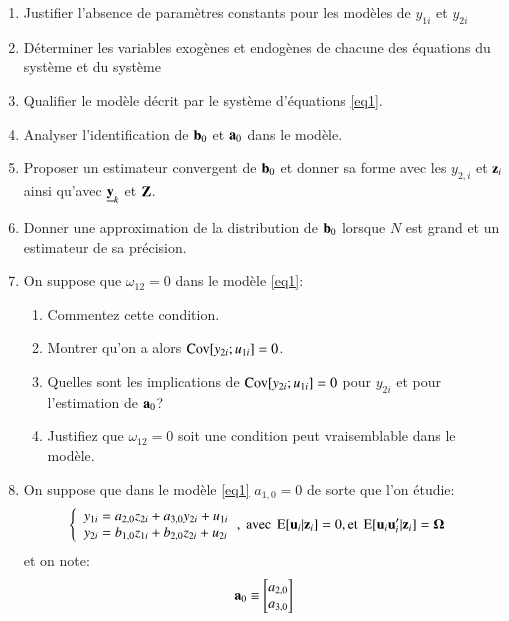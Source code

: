 \documentclass[10pt, reqno]{amsart}
\begin{document}
\begin{enumerate}
    \item Justifier l’absence de paramètres constants pour les modèles de $y_{1i}$ et $y_{2i}$ 
    \item  Déterminer les variables exogènes et endogènes de chacune des équations
    du système et du système
    \item Qualifier le modèle décrit par le système d’équations \eqref{eq1}.
    \item Analyser l’identification de ${\mathbf b}_0$ et ${\mathbf a}_0$ dans le modèle.  
    \item Proposer un estimateur convergent de ${\mathbf b}_0$ et donner sa forme avec les $y_{2,i}$ et ${\mathbf z}_i$ 
    ainsi qu’avec $\underline{{\mathbf y}}_k$ et $\mathbf Z$.
    \item Donner une approximation de la distribution de ${\mathbf b}_0$ lorsque $N$ est grand et un estimateur de sa précision.
    \item On suppose que $\omega_{12} = 0$ dans le modèle \eqref{eq1}:
    \begin{enumerate}
        \item Commentez cette condition. 
        \item Montrer qu’on a alors $\operatorname{Cov}[y_{2i}; u_{1i}]= 0$.
        \item Quelles sont les implications de $\operatorname{Cov}[y_{2i}; u_{1i}]= 0$ pour $y_{2i}$ et pour l’estimation de ${\mathbf a}_0$?
        \item Justifiez que $\omega_{12} = 0$ soit une condition peut vraisemblable dans le modèle.
    \end{enumerate}
    \item On suppose que dans le modèle \eqref{eq1} $a_{1, 0} = 0$ de sorte que l'on étudie:
    \begin{align}
        \left\{
     \begin{array}{ll}
        y_{1i} =  a_{2,0}z_{2i} + a_{3,0}y_{2i} +u_{1i}\\
        y_{2i}= b_{1,0}z_{1i} + b_{2,0}z_{2i}+u_{2i}
     \end{array}
    \right.
    &, \ \text{avec} \  \Exp[\boldu_i|\boldz_i] =0,  \text{et} \ \Exp[\boldu_i\boldu_i^\prime|\boldz_i]=\boldOmega
    \label{eq2}
     \end{align}
     et on note:
     \[
        {\mathbf a}_0 \equiv 
        \begin{bmatrix}
            a_{2, 0}\\
            a_{3, 0}
        \end{bmatrix}
\]
\end{enumerate}
\end{document}
